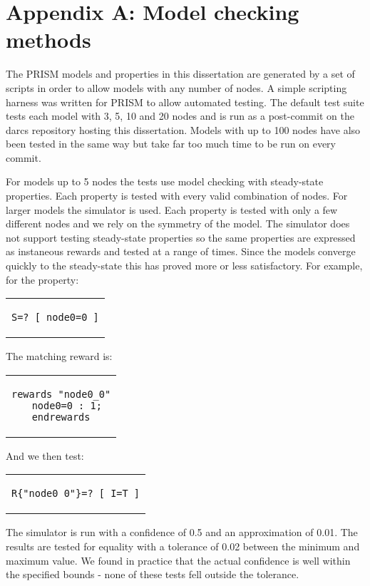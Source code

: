 \documentclass[a4paper,10pt]{article}
\newenvironment{prismprop}[0]{
  \begin{center}
  \begin{tabular}{c}
  \footnotesize
}{
  \end{tabular}
  \end{center}
}
\begin{document}


\clearpage

\section*{Appendix A: Model checking methods}

The PRISM models and properties in this dissertation are generated by a set of scripts in order to allow models with any number of nodes. A simple scripting harness was written for PRISM to allow automated testing. The default test suite tests each model with 3, 5, 10 and 20 nodes and is run as a post-commit on the darcs repository hosting this dissertation. Models with up to 100 nodes have also been tested in the same way but take far too much time to be run on every commit. 

For models up to 5 nodes the tests use model checking with steady-state properties. Each property is tested with every valid combination of nodes. For larger models the simulator is used. Each property is tested with only a few different nodes and we rely on the symmetry of the model. The simulator does not support testing steady-state properties so the same properties are expressed as instaneous rewards and tested at a range of times. Since the models converge quickly to the steady-state this has proved more or less satisfactory. For example, for the property:

\begin{prismprop}
\begin{lstlisting}
S=? [ node0=0 ]
\end{lstlisting}
\end{prismprop}

\noindent The matching reward is:

\begin{prismprop}
\begin{lstlisting}
rewards "node0_0"
  node0=0 : 1;
endrewards
\end{lstlisting}
\end{prismprop}

\noindent And we then test:

\begin{prismprop}
\begin{lstlisting}
R{"node0_0"}=? [ I=T ]
\end{lstlisting}
\end{prismprop}

The simulator is run with a confidence of 0.5 and an approximation of 0.01. The results are tested for equality with a tolerance of 0.02 between the minimum and maximum value. We found in practice that the actual confidence is well within the specified bounds - none of these tests fell outside the tolerance.
\end{document}
